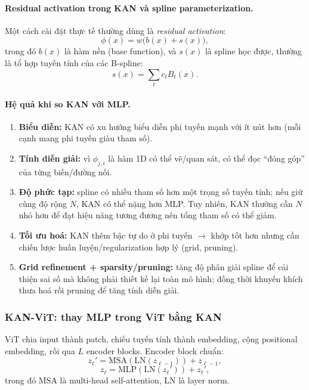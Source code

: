\documentclass[../DoAn.tex]{subfiles}
\begin{document}
\paragraph{Residual activation trong KAN và spline parameterization.}
Một cách cài đặt thực tế thường dùng là \textit{residual activation}:
\begin{equation}
  \phi(x) = w\big(b(x)+s(x)\big),
\end{equation}
trong đó $b(x)$ là hàm nền (base function), và $s(x)$ là spline học được, thường là tổ hợp tuyến tính của các B-spline:
\begin{equation}
  s(x) = \sum_{t} c_t B_t(x).
\end{equation}

\paragraph{Hệ quả khi so KAN với MLP.}
\begin{enumerate}
  \item \textbf{Biểu diễn:} KAN có xu hướng biểu diễn phi tuyến mạnh với ít nút hơn (mỗi cạnh mang phi tuyến giàu tham số).
  \item \textbf{Tính diễn giải:} vì $\phi_{j,i}$ là hàm 1D có thể vẽ/quan sát, có thể đọc ``đóng góp'' của từng biến/đường nối.
  \item \textbf{Độ phức tạp:} spline có nhiều tham số hơn một trọng số tuyến tính; nếu giữ cùng độ rộng $N$, KAN có thể nặng hơn MLP.
    Tuy nhiên, KAN thường cần $N$ nhỏ hơn để đạt hiệu năng tương đương nên tổng tham số có thể giảm.
  \item \textbf{Tối ưu hoá:} KAN thêm bậc tự do ở phi tuyến $\rightarrow$ khớp tốt hơn nhưng cần chiến lược huấn luyện/regularization hợp lý (grid, pruning).
  \item \textbf{Grid refinement + sparsity/pruning:} tăng độ phân giải spline để cải thiện sai số mà không phải thiết kế lại toàn mô hình; đồng thời khuyến khích thưa hoá rồi pruning để tăng tính diễn giải.
\end{enumerate}

\subsubsection{KAN-ViT: thay MLP trong ViT bằng KAN}

ViT chia input thành patch, chiếu tuyến tính thành embedding, cộng positional embedding, rồi qua $L$ encoder blocks.
Encoder block chuẩn:
\begin{equation}
  z_\ell' = \mathrm{MSA}(\mathrm{LN}(z_{\ell-1})) + z_{\ell-1},
\end{equation}
\begin{equation}
  z_\ell = \mathrm{MLP}(\mathrm{LN}(z_\ell')) + z_\ell',
\end{equation}
trong đó MSA là multi-head self-attention, LN là layer norm.
\end{document}
